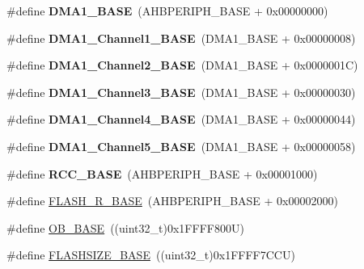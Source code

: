 \begin{DoxyCompactItemize}
\#define {\bfseries D\+M\+A1\+\_\+\+B\+A\+SE}~(A\+H\+B\+P\+E\+R\+I\+P\+H\+\_\+\+B\+A\+SE + 0x00000000)
\item 
\mbox{\label{group___peripheral__memory__map_ga888dbc1608243badeb3554ffedc7364c}} 
\#define {\bfseries D\+M\+A1\+\_\+\+Channel1\+\_\+\+B\+A\+SE}~(D\+M\+A1\+\_\+\+B\+A\+SE + 0x00000008)
\item 
\mbox{\label{group___peripheral__memory__map_ga38a70090eef3687e83fa6ac0c6d22267}} 
\#define {\bfseries D\+M\+A1\+\_\+\+Channel2\+\_\+\+B\+A\+SE}~(D\+M\+A1\+\_\+\+B\+A\+SE + 0x0000001\+C)
\item 
\mbox{\label{group___peripheral__memory__map_ga70b3d9f36ca9ce95b4e421c11154fe5d}} 
\#define {\bfseries D\+M\+A1\+\_\+\+Channel3\+\_\+\+B\+A\+SE}~(D\+M\+A1\+\_\+\+B\+A\+SE + 0x00000030)
\item 
\mbox{\label{group___peripheral__memory__map_ga1adc93cd0baf0897202c71110e045692}} 
\#define {\bfseries D\+M\+A1\+\_\+\+Channel4\+\_\+\+B\+A\+SE}~(D\+M\+A1\+\_\+\+B\+A\+SE + 0x00000044)
\item 
\mbox{\label{group___peripheral__memory__map_gac041a71cd6c1973964f847a68aa14478}} 
\#define {\bfseries D\+M\+A1\+\_\+\+Channel5\+\_\+\+B\+A\+SE}~(D\+M\+A1\+\_\+\+B\+A\+SE + 0x00000058)
\item 
\mbox{\label{group___peripheral__memory__map_ga0e681b03f364532055d88f63fec0d99d}} 
\#define {\bfseries R\+C\+C\+\_\+\+B\+A\+SE}~(A\+H\+B\+P\+E\+R\+I\+P\+H\+\_\+\+B\+A\+SE + 0x00001000)
\item 
\#define \hyperlink{group___peripheral__memory__map_ga8e21f4845015730c5731763169ec0e9b}{F\+L\+A\+S\+H\+\_\+\+R\+\_\+\+B\+A\+SE}~(A\+H\+B\+P\+E\+R\+I\+P\+H\+\_\+\+B\+A\+SE + 0x00002000)
\item 
\#define \hyperlink{group___peripheral__memory__map_gab5b5fb155f9ee15dfb6d757da1adc926}{O\+B\+\_\+\+B\+A\+SE}~((uint32\+\_\+t)0x1\+F\+F\+F\+F800\+U)
\item 
\#define \hyperlink{group___peripheral__memory__map_ga776d985f2d4d40b588ef6ca9d573af78}{F\+L\+A\+S\+H\+S\+I\+Z\+E\+\_\+\+B\+A\+SE}~((uint32\+\_\+t)0x1\+F\+F\+F\+F7\+C\+C\+U)

\end{DoxyCompactItemize}
